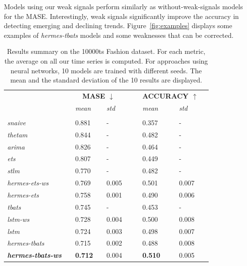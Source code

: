 \documentclass[review]{elsarticle}
\begin{document}
Models using our weak signals perform similarly as without-weak-signals models for the MASE.  Interestingly, weak signals significantly improve the accuracy in detecting emerging and declining trends. Figure~\ref{fig:examples} displays some examples of \textit{hermes-tbats} models and some weaknesses that can be corrected.

\begin{table}
  \caption{Results summary on the 10000ts Fashion dataset. For each metric, the average on all our time series is computed. For approaches using neural networks, 10 models are trained with different seeds. The mean and the standard deviation of the 10 results are displayed.}
  \centering
  \begin{tabular}{l||lllll|lllll}
   &&\multicolumn{3}{c}{\textbf{MASE $\downarrow$}} &&& \multicolumn{3}{c}{\textbf{ACCURACY $\uparrow$}}&\\
    &&  \textit{mean}  && \textit{std} &&&  \textit{mean}  && \textit{std}& \\
	 \hline
	 &&&&&&&&&&\\
     \textit{snaive} && 0.881 && - &&& 0.357 && - &\\
     \textit{thetam}  && 0.844 && -&&& 0.482 && - &\\
     \textit{arima} && 0.826 && -&&& 0.464 && - & \\
     \textit{ets} && 0.807 && -&&& 0.449 && - & \\
     \textit{stlm} && 0.770 && -&&& 0.482 && - & \\
     \textit{hermes-ets-ws} && 0.769 && 0.005 &&& 0.501 && 0.007 &\\
     \textit{hermes-ets} && 0.758 && 0.001 &&& 0.490 && 0.006 &\\
     \textit{tbats} && 0.745 && -&&& 0.453 && - & \\
     \textit{lstm-ws} && 0.728 && 0.004 &&& 0.500 && 0.008 &\\
     \textit{lstm} && 0.724 && 0.003 &&& 0.498 && 0.007 &\\
     \textit{hermes-tbats} && 0.715 && 0.002 &&& 0.488 && 0.008 &\\
     \textbf{\textit{hermes-tbats-ws}} && \textbf{0.712} && 0.004 &&& \textbf{0.510} && 0.005 &\\
  \end{tabular}
\label{tab:metricresults}
\end{table}
\end{document}

